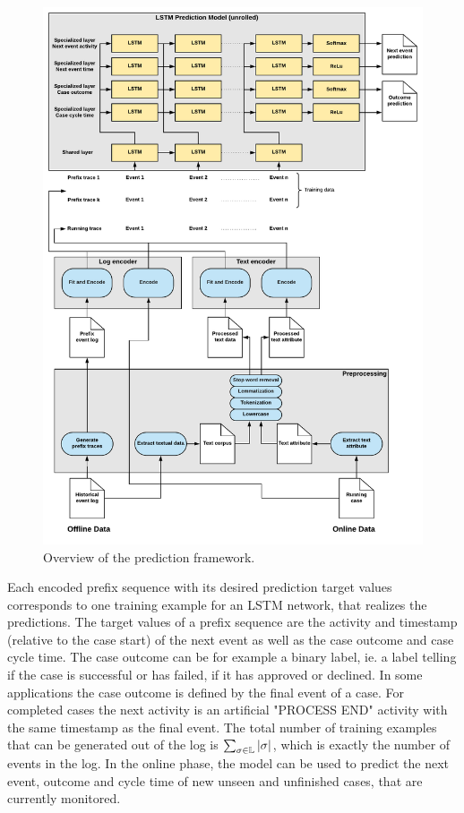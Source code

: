 \begin{figure}[!htbp]
	\includegraphics[width=\textwidth]{figures/framework}
	\caption{Overview of the prediction framework.}
	\label{fig:framework}
\end{figure}

Each encoded prefix sequence with its desired prediction target values corresponds to one training example for an LSTM network, that realizes the predictions. 
The target values of a prefix sequence are the activity and timestamp (relative to the case start) of the next event as well as the case outcome and case cycle time.
The case outcome can be for example a binary label, ie. a label telling if the case is successful or has failed, if it has approved or declined.
In some applications the case outcome is defined by the final event of a case.
For completed cases the next activity is an artificial "PROCESS END" activity with the same timestamp as the final event.
The total number of training examples that can be generated out of the log is $\sum_{\sigma \in \mathbb{L}}|\sigma|$, which is exactly the number of events in the log.
In the online phase, the model can be used to predict the next event, outcome and cycle time of new unseen and unfinished cases, that are currently monitored.


